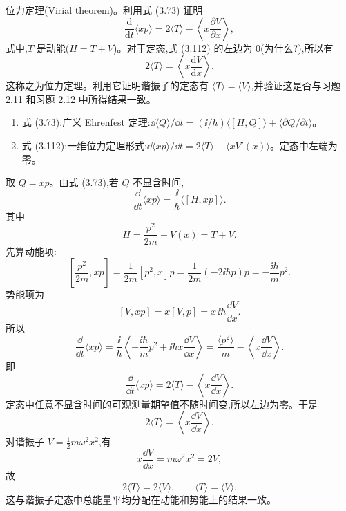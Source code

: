 \begin{question}
位力定理(Virial theorem)。利用式 (3.73) 证明
\[
\frac{\mathrm d}{\mathrm dt}\langle xp\rangle=2\langle T\rangle-\left\langle x\frac{\partial V}{\partial x}\right\rangle,
\tag{3.112}
\]
式中,$T$ 是动能($H=T+V$)。对于定态,式 (3.112) 的左边为 0(为什么?),所以有
\[
2\langle T\rangle=\left\langle x\frac{\mathrm dV}{\mathrm dx}\right\rangle .
\tag{3.113}
\]
这称之为位力定理。利用它证明谐振子的定态有 $\langle T\rangle=\langle V\rangle$,并验证这是否与习题 2.11 和习题 2.12 中所得结果一致。

\par\smallskip
{}
\begin{enumerate}[leftmargin=2.2em,itemsep=0.12em,topsep=0.12em,parsep=0pt]
\item 式 (3.73):广义 Ehrenfest 定理:$\dd\langle Q\rangle/\dd t=(\ii/\hbar)\langle[H,Q]\rangle+\langle\partial Q/\partial t\rangle$。
\item 式 (3.112):一维位力定理形式:$\dd\langle xp\rangle/\dd t=2\langle T\rangle-\langle xV'(x)\rangle$。定态中左端为零。
\end{enumerate}

\begin{solution}
取 $Q=xp$。由式 (3.73),若 $Q$ 不显含时间,
\[
\frac{\dd}{\dd t}\langle xp\rangle=\frac{\ii}{\hbar}\langle[H,xp]\rangle.
\]
其中
\[
H=\frac{p^2}{2m}+V(x)=T+V.
\]
先算动能项:
\[
\left[\frac{p^2}{2m},xp\right]
=\frac1{2m}[p^2,x]p
=\frac1{2m}(-2\ii\hbar p)p
=-\frac{\ii\hbar}{m}p^2.
\]
势能项为
\[
[V,xp]=x[V,p]=x\,\ii\hbar\frac{\dd V}{\dd x}.
\]
所以
\[
\frac{\dd}{\dd t}\langle xp\rangle
=\frac{\ii}{\hbar}\left\langle-\frac{\ii\hbar}{m}p^2
+\ii\hbar x\frac{\dd V}{\dd x}\right\rangle
=\frac{\langle p^2\rangle}{m}-\left\langle x\frac{\dd V}{\dd x}\right\rangle.
\]
即
\[
\boxed{\frac{\dd}{\dd t}\langle xp\rangle=2\langle T\rangle-\left\langle x\frac{\dd V}{\dd x}\right\rangle.}
\]
定态中任意不显含时间的可观测量期望值不随时间变,所以左边为零。于是
\[
2\langle T\rangle=\left\langle x\frac{\dd V}{\dd x}\right\rangle.
\]
对谐振子 $V=\frac12m\omega^2x^2$,有
\[
x\frac{\dd V}{\dd x}=m\omega^2x^2=2V,
\]
故
\[
2\langle T\rangle=2\langle V\rangle,
\qquad
\boxed{\langle T\rangle=\langle V\rangle.}
\]
这与谐振子定态中总能量平均分配在动能和势能上的结果一致。
\end{solution}
\end{question}

